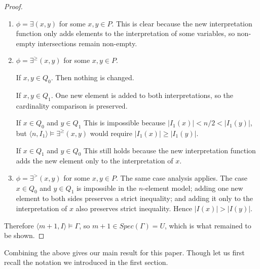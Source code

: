 \documentclass[12pt, reqno]{amsart}
\theoremstyle{definition}
\theoremstyle{remark}
\numberwithin{equation}{section}
\begin{document}
\begin{proof}
\begin{enumerate}
		 If $x, y \in Q_1$ this case follows since the new interpretation function adds the same elements to the interpretation of both variables.		 
		 
		If $x \in Q_0$ and $y \in Q_1$. This is clear since the new function adds the only new elements to the interpretation of all variables in $Q_1$. 		 
		 
		 
		If $x \in Q_1$ and $y \in Q_0$. This is impossible since $\langle n, I_1\rangle \models \forall(x, y)$ we have $I_1(x) \subseteq I_1(y)$ and hence $|I_1(x)| \leq |I_1(y)|$, contradicting $|I_1(x)| > \frac{n}{2} > |I_1(y)|$.
		 
		 Thus, in all possible cases, we have $\langle m+1, I\rangle \models \phi$. 
		 \item $\phi = \exists(x, y)$ for some $x, y \in P$. This is clear because the new interpretation function only adds elements to the interpretation of some variables, so non-empty intersections remain non-empty. 
 		 \item $\phi = \exists^{\geq}(x, y)$ for some $x, y \in P$. 
		 
		  If $x, y \in Q_0$. Then nothing is changed. 
		  
		 If $x, y \in Q_1$. One new element is added to both interpretations, so the cardinality comparison is preserved. 
		 
		 If $x \in Q_0$ and $y \in Q_1$ This is impossible because $|I_1(x)|<n/2<|I_1(y)|$, but $\langle n,I_1\rangle\models\exists^{\geq}(x,y)$ would require $|I_1(x)|\geq|I_1(y)|$.

		 If $x \in Q_1$ and $y \in Q_0$ This still holds because the new interpretation function adds the new element only to the interpretation of $x$. 
  		 \item $\phi = \exists^{>}(x, y)$ for some $x, y \in P$. The same case analysis applies. The case $x\in Q_0$ and $y\in Q_1$ is impossible in the $n$-element model; adding one new element to both sides preserves a strict inequality; and adding it only to the interpretation of $x$ also preserves strict inequality. Hence $|I(x)|>|I(y)|$. 
 	\end{enumerate}

	Therefore $\langle m+1, I\rangle \models \Gamma$, so $m + 1 \in Spec(\Gamma) = U$, which is what remained to be shown.
\end{proof}

Combining the above gives our main result for this paper. Though let us first recall the notation we introduced in the first section. 
\end{document}
